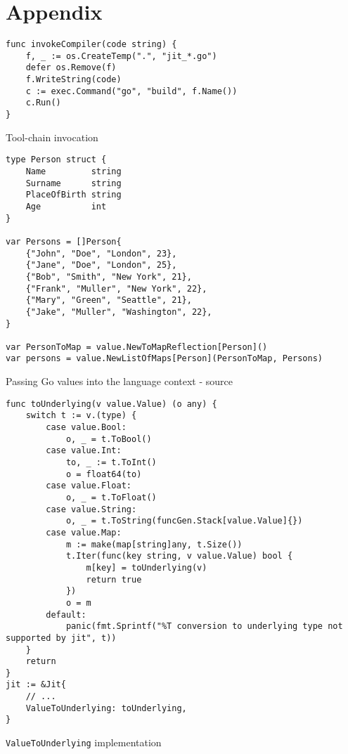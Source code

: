 \chapter{Appendix}


\begin{listing}[H]
    \begin{verbatim}
func invokeCompiler(code string) {
    f, _ := os.CreateTemp(".", "jit_*.go")
    defer os.Remove(f)
    f.WriteString(code)
    c := exec.Command("go", "build", f.Name())
    c.Run()
}
    \end{verbatim}
    \caption{Tool-chain invocation}
    \label{code:compiler_invocation}
\end{listing}

\begin{listing}[H]
    \begin{verbatim}
type Person struct {
	Name         string
	Surname      string
	PlaceOfBirth string
	Age          int
}

var Persons = []Person{
	{"John", "Doe", "London", 23},
	{"Jane", "Doe", "London", 25},
	{"Bob", "Smith", "New York", 21},
	{"Frank", "Muller", "New York", 22},
	{"Mary", "Green", "Seattle", 21},
	{"Jake", "Muller", "Washington", 22},
}

var PersonToMap = value.NewToMapReflection[Person]()
var persons = value.NewListOfMaps[Person](PersonToMap, Persons)
    \end{verbatim}
    \caption{Passing Go values into the language context - source \cite{parser2_xnacly}}
    \label{code:go-to-language-interop}
\end{listing}

\begin{listing}[H]
    \begin{verbatim}
func toUnderlying(v value.Value) (o any) {
    switch t := v.(type) {
        case value.Bool:
            o, _ = t.ToBool()
        case value.Int:
            to, _ := t.ToInt()
            o = float64(to)
        case value.Float:
            o, _ = t.ToFloat()
        case value.String:
            o, _ = t.ToString(funcGen.Stack[value.Value]{})
        case value.Map:
            m := make(map[string]any, t.Size())
            t.Iter(func(key string, v value.Value) bool {
                m[key] = toUnderlying(v)
                return true
            })
            o = m
        default:
            panic(fmt.Sprintf("%T conversion to underlying type not supported by jit", t))
    }
    return
}
jit := &Jit{
    // ...
    ValueToUnderlying: toUnderlying,
}
    \end{verbatim}
    \caption{\texttt{ValueToUnderlying} implementation}
    \label{code:type-clashes-impl-tounderlying}
\end{listing}

